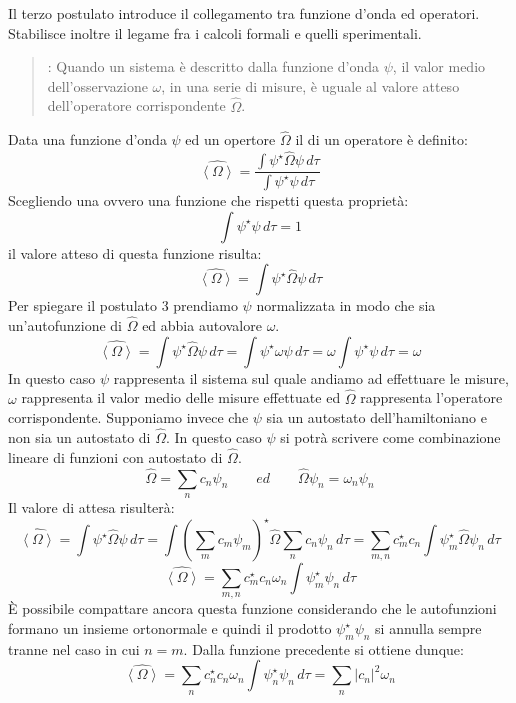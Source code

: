 Il terzo postulato introduce il collegamento tra funzione d'onda ed operatori. Stabilisce inoltre il legame fra i calcoli formali e quelli sperimentali.
\begin{quote}
: Quando un sistema è descritto dalla funzione d'onda $\psi$, il valor medio dell'osservazione $\omega$, in una serie di misure, è uguale al valore atteso dell'operatore corrispondente $\hat{\Omega}$.
\end{quote}
Data una funzione d'onda $\psi$ ed un opertore $\hat{\Omega}$ il  di un operatore è definito:
$$\hat{\left \langle \Omega \right \rangle} = \frac{ \int \psi^{\star} \hat{\Omega} \psi \,d\tau }{ \int \psi^{\star} \psi \,d\tau }$$
Scegliendo una  ovvero una funzione che rispetti questa proprietà:
$$\int \psi^{\star} \psi \,d\tau = 1$$
il valore atteso di questa funzione risulta:
$$\hat{\left \langle \Omega \right \rangle} = \int \psi^{\star} \hat{\Omega} \psi \,d\tau$$
Per spiegare il postulato 3 prendiamo $\psi$ normalizzata in modo che sia un'autofunzione di $\hat{\Omega}$ ed abbia autovalore $\omega$.
$$\hat{\left \langle \Omega \right \rangle} = \int \psi^{\star} \hat{\Omega} \psi \,d\tau = \int \psi^{\star} \omega \psi \,d\tau = \omega \int \psi^{\star} \psi \,d\tau = \omega$$
In questo caso $\psi$ rappresenta il sistema sul quale andiamo ad effettuare le misure, $\omega$ rappresenta il valor medio delle misure effettuate ed $\hat{\Omega}$ rappresenta l'operatore corrispondente.
Supponiamo invece che $\psi$ sia un autostato dell'hamiltoniano e non sia un autostato di $\hat{\Omega}$. In questo caso $\psi$ si potrà scrivere come combinazione lineare di funzioni con autostato di $\hat{\Omega}$.
$$\hat{\Omega} = \sum_n c_n \psi_n \qquad ed \qquad \hat{\Omega} \psi_n = \omega_n \psi_n$$
Il valore di attesa risulterà:
$$\hat{\left \langle \Omega \right \rangle} = \int \psi^{\star} \hat{\Omega} \psi \,d\tau = \int {\left(\sum_m c_m \psi_m\right)}^{\star} \hat{\Omega} \sum_n c_n \psi_n \,d\tau = \sum_{m,n} c_m^{\star} c_n \int \psi_m^{\star} \hat{\Omega} \psi_n \, d\tau$$
$$\hat{\left \langle \Omega \right \rangle} = \sum_{m,n} c_m^{\star} c_n \omega_n \int \psi_m^{\star} \psi_n \, d\tau$$
È possibile compattare ancora questa funzione considerando che le autofunzioni formano un insieme ortonormale e quindi il prodotto $\psi_m^{\star} \psi_n$ si annulla sempre tranne nel caso in cui $n = m$. Dalla funzione precedente si ottiene dunque:
$$\hat{\left \langle \Omega \right \rangle} = \sum_{n} c_n^{\star} c_n \omega_n \int \psi_n^{\star} \psi_n \, d\tau = \sum_n {\left| c_n \right|}^2 \omega_n$$
